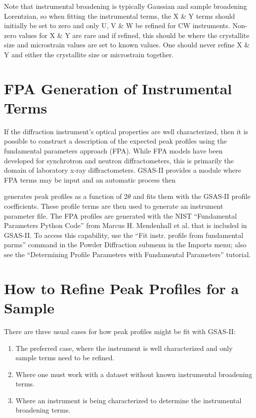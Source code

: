  Note that instrumental broadening is typically Gaussian and sample broadening Lorentzian, so when fitting the instrumental terms, the X \& Y terms should initially be set to zero and only U, V \& W be refined for CW instruments. Non-zero values for X \& Y are rare and if refined, this should be where the crystallite size and microstrain values are set to known values. One should never refine X \& Y and either the crystallite size or microstrain together. 

 

\section{FPA Generation of Instrumental Terms}

If the diffraction instrument’s optical properties are well characterized, then it is possible to construct a description of the expected peak profiles using the fundamental parameters approach (FPA). While FPA models have been developed for synchrotron and neutron diffractometers, this is primarily the domain of laboratory x-ray diffractometers. GSAS-II provides a module where FPA terms may be input and an automatic process then 

generates peak profiles as a function of $2\theta$ and fits them with the GSAS-II profile coefficients. These profile terms are then used to generate an instrument parameter file. The FPA profiles are generated with the NIST ``Fundamental Parameters Python Code'' from Marcus H. Mendenhall et al. that is included in GSAS-II. To access this capability, use the “Fit instr. profile from fundamental parms” command in the Powder Diffraction submenu in the Imports menu; also see the ``Determining Profile Parameters with Fundamental Parameters'' tutorial. 


\section{How to Refine Peak Profiles for a Sample}

There are three usual cases for how peak profiles might be fit with GSAS-II: 

\begin{enumerate}
\item The preferred case, where the instrument is well characterized and only sample terms need to be refined. 

\item Where one must work with a dataset without known instrumental broadening terms. 

\item Where an instrument is being characterized to determine the instrumental broadening terms. 
\end{enumerate}

